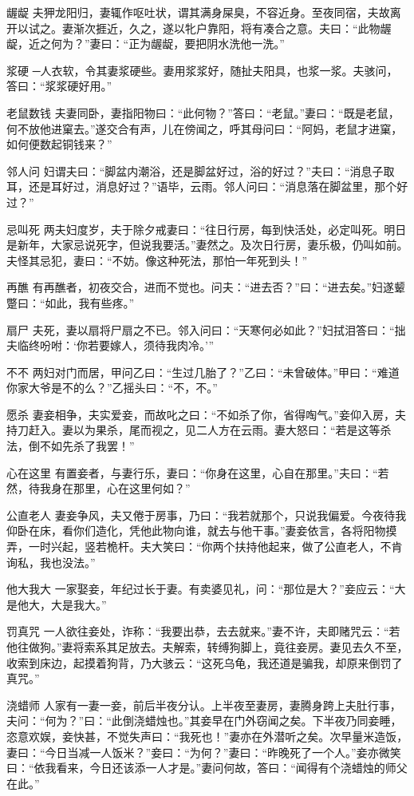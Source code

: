 \documentclass[12pt,UTF8]{ctexbook}
\begin{document}
龌龊
夫狎龙阳归，妻辄作呕吐状，谓其满身屎臭，不容近身。至夜同宿，夫故离开以试之。妻渐次捱近，久之，遂以牝户靠阳，将有凑合之意。夫曰：“此物龌龊，近之何为？”妻曰：“正为龌龊，要把阴水洗他一洗。”

浆硬
─人衣软，令其妻浆硬些。妻用浆浆好，随扯夫阳具，也浆一浆。夫骇问，答曰：“浆浆硬好用。”

老鼠数钱
夫妻同卧，妻指阳物曰：“此何物？”答曰：“老鼠。”妻曰：“既是老鼠，何不放他进窠去。”遂交合有声，儿在傍闻之，呼其母问曰：“阿妈，老鼠才进窠，如何便数起铜钱来？”

邻人问
妇谓夫曰：“脚盆内潮浴，还是脚盆好过，浴的好过？”夫曰：“消息子取耳，还是耳好过，消息好过？”语毕，云雨。邻人问曰：“消息落在脚盆里，那个好过？”

忌叫死
两夫妇度岁，夫于除夕戒妻曰：“往日行房，每到快活处，必定叫死。明日是新年，大家忌说死字，但说我要活。”妻然之。及次日行房，妻乐极，仍叫如前。夫怪其忌犯，妻曰：“不妨。像这种死法，那怕一年死到头！”

再醮
有再醮者，初夜交合，进而不觉也。问夫：“进去否？”曰：“进去矣。”妇遂颦蹩曰：“如此，我有些疼。”

扇尸
夫死，妻以扇将尸扇之不已。邻入问曰：“天寒何必如此？”妇拭泪答曰：“拙夫临终吩咐：‘你若要嫁人，须待我肉冷。’”

不不
两妇对门而居，甲问乙曰：“生过几胎了？”乙曰：“未曾破体。”甲曰：“难道你家大爷是不的么？”乙摇头曰：“不，不。”

愿杀
妻妾相争，夫实爱妾，而故叱之曰：“不如杀了你，省得啕气。”妾仰入房，夫持刀赶入。妻以为果杀，尾而视之，见二人方在云雨。妻大怒曰：“若是这等杀法，倒不如先杀了我罢！”

心在这里
有置妾者，与妻行乐，妻曰：“你身在这里，心自在那里。”夫曰：“若然，待我身在那里，心在这里何如？”

公直老人
妻妾争风，夫又倦于房事，乃曰：“我若就那个，只说我偏爱。今夜待我仰卧在床，看你们造化，凭他此物向谁，就去与他干事。”妻妾依言，各将阳物摸弄，一时兴起，竖若桅杆。夫大笑曰：“你两个扶持他起来，做了公直老人，不肯询私，我也没法。”

他大我大
一家娶妾，年纪过长于妻。有卖婆见礼，问：“那位是大？”妾应云：“大是他大，大是我大。”

罚真咒
一人欲往妾处，诈称：“我要出恭，去去就来。”妻不许，夫即赌咒云：“若他往做狗。”妻将索系其足放去。夫解索，转缚狗脚上，竟往妾房。妻见去久不至，收索到床边，起摸着狗背，乃大骇云：“这死乌龟，我还道是骗我，却原来倒罚了真咒。”

浇蜡师
人家有一妻一妾，前后半夜分认。上半夜至妻房，妻腾身跨上夫肚行事，夫问：“何为？”曰：“此倒浇蜡烛也。”其妾早在门外窃闻之矣。下半夜乃同妾睡，恣意欢娱，妾快甚，不觉失声曰：“我死也！”妻亦在外潜听之矣。次早量米造饭，妻曰：“今日当减一人饭米？”妾曰：“为何？”妻曰：“昨晚死了一个人。”妾亦微笑曰：“依我看来，今日还该添一人才是。”妻问何故，答曰：“闻得有个浇蜡烛的师父在此。”
\end{document}
